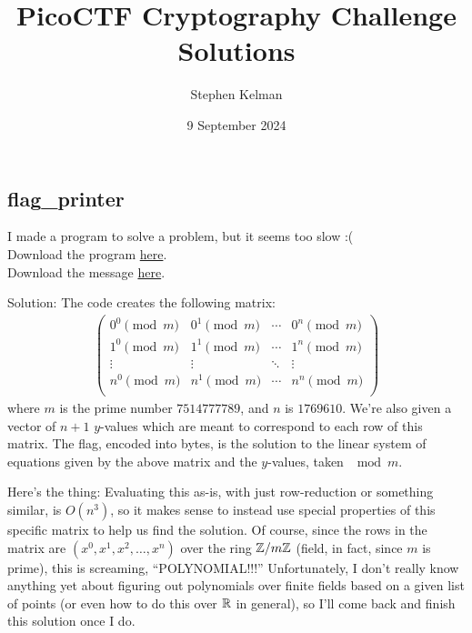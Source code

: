 \documentclass{article}
\title{PicoCTF Cryptography Challenge Solutions}
\author{Stephen Kelman}
\date{9 September 2024}
\begin{document}
 
\maketitle
\begin{mdframed}
    \section*{flag\_printer}
    I made a program to solve a problem, but it seems too slow :(\\
    Download the program \href{https://artifacts.picoctf.net/c_titan/19/flag_printer.py}{here}.\\
    Download the message \href{https://artifacts.picoctf.net/c_titan/19/encoded.txt}{here}.\\
\end{mdframed}
Solution:
The code creates the following matrix:
\begin{gather*}
    \begin{pmatrix}
        0^0\pmod{m} & 0^1\pmod{m} & \cdots & 0^{n}\pmod{m}\\
        1^0\pmod{m} & 1^1\pmod{m} & \cdots & 1^{n}\pmod{m}\\
        \vdots & \vdots & \ddots & \vdots \\
        n^0\pmod{m} & n^1\pmod{m} &\cdots & n^n\pmod{m} \\
    \end{pmatrix}
\end{gather*}
where $m$ is the prime number $7514777789$, and $n$ is $1769610$.
We're also given a vector of $n+1$ $y$-values which are meant to correspond to each row of this matrix.
The flag, encoded into bytes, is the solution to the linear system of equations given by the above matrix and
the $y$-values, taken $\mod m$.

Here's the thing: Evaluating this as-is, with just row-reduction or something similar, is $O(n^3)$, so 
it makes sense to instead use special properties of this specific matrix to help us find the solution.
Of course, since the rows in the matrix are $(x^0,x^1,x^2,\ldots,x^n)$ over the ring $\mathbb{Z}/m\mathbb{Z}$ 
(field, in fact, since $m$ is prime), this is screaming, ``POLYNOMIAL!!!''
Unfortunately, I don't really know anything yet about figuring out polynomials over finite fields based on
a given list of points (or even how to do this over $\mathbb{R}$ in general), so I'll come back and finish this solution once I do.
\end{document}
